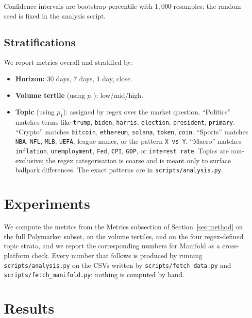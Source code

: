 \documentclass{article}
\begin{document}
Confidence intervals are bootstrap-percentile with $1{,}000$
resamples; the random seed is fixed in the analysis script.

\subsection{Stratifications}

We report metrics overall and stratified by:

\begin{itemize}
\item \textbf{Horizon:} 30 days, 7 days, 1 day, close.
\item \textbf{Volume tertile} (using $p_{1}$): low/mid/high.
\item \textbf{Topic} (using $p_{1}$): assigned by regex over the
      market question. ``Politics'' matches terms like \texttt{trump},
      \texttt{biden}, \texttt{harris}, \texttt{election},
      \texttt{president}, \texttt{primary}. ``Crypto'' matches
      \texttt{bitcoin}, \texttt{ethereum}, \texttt{solana},
      \texttt{token}, \texttt{coin}. ``Sports'' matches
      \texttt{NBA}, \texttt{NFL}, \texttt{MLB}, \texttt{UEFA},
      league names, or the pattern \texttt{X vs Y}. ``Macro''
      matches \texttt{inflation}, \texttt{unemployment}, \texttt{Fed},
      \texttt{CPI}, \texttt{GDP}, or \texttt{interest rate}. Topics
      are non-exclusive; the regex categorisation is coarse and is
      meant only to surface ballpark differences. The exact patterns
      are in \texttt{scripts/analysis.py}.
\end{itemize}

\section{Experiments}

We compute the metrics from the Metrics subsection of
Section~\ref{sec:method} on the full Polymarket subset, on the volume
tertiles, and on the four regex-defined topic strata, and we report
the corresponding numbers for Manifold as a cross-platform check.
Every number that follows is produced by running
\texttt{scripts/analysis.py} on the CSVs written by
\texttt{scripts/fetch\_data.py} and \texttt{scripts/fetch\_manifold.py};
nothing is computed by hand.

\section{Results}
\end{document}
